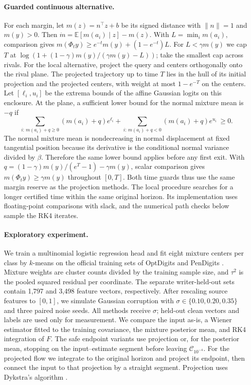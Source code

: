 \paragraph{Guarded continuous alternative.}
For each margin, let \(m(z)=n^\top z+b\) be its signed distance with \(\|n\|=1\) and \(m(y)>0\). Then
\(\dot m=\mathbb E[m(a_i)\mid z]-m(z)\).
With \(L=\min_i m(a_i)\), comparison gives
\(m(\Phi_t y)\ge e^{-t}m(y)+(1-e^{-t})L\).
For \(L<\gamma m(y)\) we cap \(T\) at
\(\log(1+(1-\gamma)m(y)/(\gamma m(y)-L))\); take the smallest cap across rivals.
For the local alternative, project the query and centers orthogonally onto the rival plane. The projected trajectory up to time \(T\) lies in the hull of its initial projection and the projected centers, with weight at most \(1-e^{-T}\) on the centers. Let \([\ell_i,u_i]\) be the extrema bounds of the affine Gaussian logits on this enclosure. At the plane, a sufficient lower bound for the normal mixture mean is \(-q\) if
\[
 \sum_{i:\,m(a_i)+q\ge0}\!\!\!\!(m(a_i)+q)e^{\ell_i}
 +\sum_{i:\,m(a_i)+q<0}\!\!\!\!(m(a_i)+q)e^{u_i}\ \ge 0 .
\]
The normal mixture mean is nondecreasing in normal displacement at fixed tangential position because its derivative is the conditional normal variance divided by \(\beta\). Therefore the same lower bound applies before any first exit. With \(q=(1-\gamma)m(y)/(e^T-1)-\gamma m(y)\), scalar comparison gives \(m(\Phi_t y)\ge\gamma m(y)\) throughout \([0,T]\). Both time guards thus use the same margin reserve as the projection methods. The local procedure searches for a longer certified time within the same original horizon. Its implementation uses floating-point comparisons with slack, and the numerical path checks below sample the RK4 iterates.

\paragraph{Exploratory experiment.}
We train a multinomial logistic regression head and fit eight mixture centers per class by \(k\)-means on the official training sets of
OptDigits and PenDigits \cite{optdigits,pendigits}.
Mixture weights are cluster counts divided by the training sample size, and \(\tau^2\) is the pooled squared residual per coordinate. The separate writer-held-out sets contain 1,797 and 3,498 feature vectors, respectively. After rescaling source features to \([0,1]\), we simulate Gaussian corruption with \(\sigma\in\{0.10,0.20,0.35\}\) and three paired noise seeds. All methods receive \(\sigma\); held-out clean vectors and labels are used only for measurement. We compare the input as-is, a Wiener estimator fitted to the training covariance, the mixture posterior mean, and RK4 integration of \(F\). The safe endpoint variants use projection or, for the posterior mean, stopping on the input--estimate segment before leaving \(\mathcal C_{10^{-4}}\). For the projected flow we integrate to the original horizon and project its endpoint, then connect the input to that projection by a straight segment. Projection uses Dykstra's algorithm
\cite{dykstra}.

